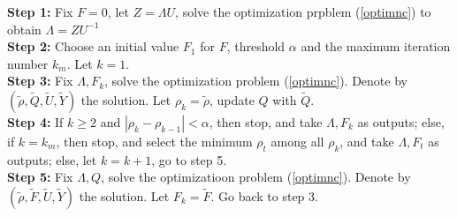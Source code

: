 \documentclass[10pt,final,journal,twoside]{IEEEtran}
\begin{document}
\textbf{Step 1:} Fix $F=0$, let $Z=\Lambda U$, solve the optimization prpblem (\ref{optimnc}) to obtain $\Lambda=ZU^{-1}$\\
\textbf{Step 2:} Choose an initial value $F_1$ for $F$, threshold $\alpha$ and the maximum iteration number $k_m$. Let $k=1$.\\
\textbf{Step 3:} Fix $\Lambda, F_k$, solve the optimization problem (\ref{optimnc}). Denote by $\left(\tilde{\rho},\tilde{Q},\tilde{U},\tilde{Y}\right)$ the solution. Let $\rho_k=\tilde{\rho}$, update $Q$ with $\tilde{Q}$.\\
\textbf{Step 4:} If $k\geq2$ and $|\rho_k-\rho_{k-1}|<\alpha$, then stop, and take $\Lambda, F_k$ as outputs; else, if $k=k_m$, then stop, and select the minimum $\rho_t$ among all $\rho_k$, and take $\Lambda, F_t$ as outputs;
else, let $k=k+1$, go to step 5.\\
\textbf{Step 5:} Fix $\Lambda, Q$, solve the optimizatioon problem (\ref{optimnc}). Denote by $\left(\tilde{\rho},\tilde{F},\tilde{U},\tilde{Y}\right)$ the solution. Let $F_k=\tilde{F}$. Go back to step 3.

\end{document}
